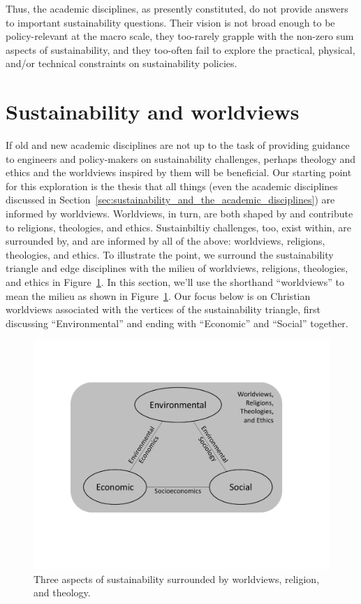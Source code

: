 \documentclass[12pt]{article}
\begin{document}
Thus, the academic disciplines, as presently constituted,
do not provide answers to important sustainability questions.
Their vision is not broad enough to be policy-relevant at the macro scale, 
they too-rarely grapple with the non-zero sum aspects of sustainability, and
they too-often fail to explore the practical, physical, and/or technical
constraints on sustainability policies. 


\section{Sustainability and worldviews}
\label{sec:worldviews}

If old and new academic disciplines are not up to the task 
of providing guidance to engineers and policy-makers
on sustainability challenges, 
perhaps theology and ethics and the worldviews inspired by them
will be beneficial.
Our starting point for this exploration is the thesis that 
all things (even the academic disciplines discussed 
in Section~\ref{sec:sustainability_and_the_academic_disciplines})
are informed by worldviews.
Worldviews, in turn, are both shaped by and contribute to religions, theologies, and ethics.
Sustainbiltiy challenges, too, exist within, are surrounded by, and are informed by 
all of the above:
worldviews, religions, theologies, and ethics.
To illustrate the point, we surround the sustainability triangle and edge disciplines with the 
milieu of worldviews, religions, theologies, and ethics in Figure~\ref{fig:3_sustain_with_worldviews}.
In this section, we'll use the shorthand ``worldviews'' to mean the milieu 
as shown in Figure~\ref{fig:3_sustain_with_worldviews}.
Our focus below is on Christian worldviews 
associated with the vertices of the sustainability triangle, 
first discussing ``Environmental'' and ending with 
``Economic'' and ``Social'' together.

\begin{figure}
\centering
\includegraphics[width=0.75\linewidth]{figure_other/TriangleDiagramWithTheology.pdf}
\caption{Three aspects of sustainability surrounded by worldviews, religion, and theology.}
\label{fig:3_sustain_with_worldviews}
\end{figure}
\end{document}

